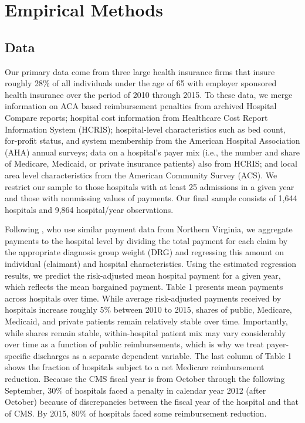\documentclass[12pt]{article}
\begin{document}
\section{Empirical Methods}
\label{sec:Empirical}


\subsection{Data}
Our primary data come from three large health insurance firms that insure roughly 28$\%$ of all individuals under the age of 65 with employer sponsored health insurance over the period of 2010 through 2015.  To these data, we merge information on ACA based reimbursement penalties from archived Hospital Compare reports; hospital cost information from Healthcare Cost Report Information System (HCRIS); hospital-level characteristics such as bed count, for-profit status, and system membership from the American Hospital Association (AHA) annual surveys; data on a hospital's payer mix (i.e., the number and share of Medicare, Medicaid, or private insurance patients) also from HCRIS; and local area level characteristics from the American Community Survey (ACS).  We restrict our sample to those hospitals with at least 25 admissions in a given year and those with nonmissing values of payments.  Our final sample consists of 1,644 hospitals and 9,864 hospital/year observations.

Following \citet{gowrisankaran2015}, who use similar payment data from Northern Virginia, we aggregate payments to the hospital level by dividing the total payment for each claim by the appropriate diagnosis group weight (DRG) and regressing this amount on individual (claimant) and hospital characteristics.  Using the estimated regression results, we predict the risk-adjusted mean hospital payment for a given year, which reflects the mean bargained payment.  Table 1 presents mean payments across hospitals over time. While average risk-adjusted payments received by hospitals increase roughly 5$\%$ between 2010 to 2015, shares of public, Medicare, Medicaid, and private patients remain relatively stable over time.  Importantly, while shares remain stable, within-hospital patient mix may vary considerably over time as a function of public reimbursements, which is why we treat payer-specific discharges as a separate dependent variable.  The last column of Table 1 shows the fraction of hospitals subject to a net Medicare reimbursement reduction.  Because the CMS fiscal year is from October through the following September, 30$\%$ of hospitals faced a penalty in calendar year 2012 (after October) because of discrepancies between the fiscal year of the hospital and that of CMS.  By 2015, 80$\%$ of hospitals faced some reimbursement reduction.  
\end{document}
